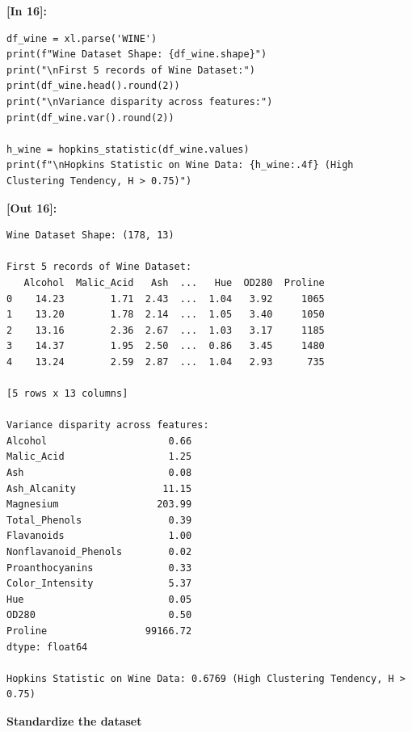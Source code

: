 \vspace{0.4em}
\noindent\textbf{\small [In 16]:}
\begin{lstlisting}[style=pycode]
df_wine = xl.parse('WINE')
print(f"Wine Dataset Shape: {df_wine.shape}")
print("\nFirst 5 records of Wine Dataset:")
print(df_wine.head().round(2))
print("\nVariance disparity across features:")
print(df_wine.var().round(2))

h_wine = hopkins_statistic(df_wine.values)
print(f"\nHopkins Statistic on Wine Data: {h_wine:.4f} (High Clustering Tendency, H > 0.75)")
\end{lstlisting}
\noindent\textbf{\small [Out 16]:}
\begin{lstlisting}[style=output]
Wine Dataset Shape: (178, 13)

First 5 records of Wine Dataset:
   Alcohol  Malic_Acid   Ash  ...   Hue  OD280  Proline
0    14.23        1.71  2.43  ...  1.04   3.92     1065
1    13.20        1.78  2.14  ...  1.05   3.40     1050
2    13.16        2.36  2.67  ...  1.03   3.17     1185
3    14.37        1.95  2.50  ...  0.86   3.45     1480
4    13.24        2.59  2.87  ...  1.04   2.93      735

[5 rows x 13 columns]

Variance disparity across features:
Alcohol                     0.66
Malic_Acid                  1.25
Ash                         0.08
Ash_Alcanity               11.15
Magnesium                 203.99
Total_Phenols               0.39
Flavanoids                  1.00
Nonflavanoid_Phenols        0.02
Proanthocyanins             0.33
Color_Intensity             5.37
Hue                         0.05
OD280                       0.50
Proline                 99166.72
dtype: float64

Hopkins Statistic on Wine Data: 0.6769 (High Clustering Tendency, H > 0.75)
\end{lstlisting}

\vspace{0.3em}
\begin{tcolorbox}[colback=gray!5!white,colframe=gray!50!black,boxrule=0.5pt,arc=2pt,left=4pt,right=4pt,top=2pt,bottom=2pt,unbreakable,before upper={\sloppy\raggedright}]
{\small\bfseries Standardize the dataset\par}
\end{tcolorbox}

